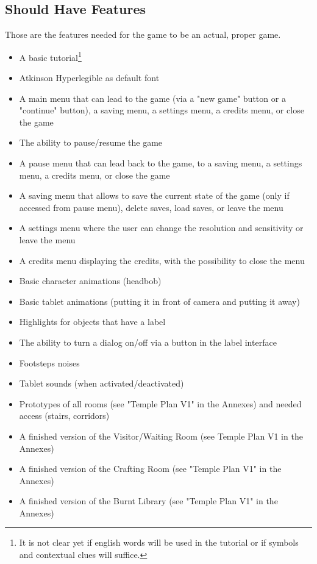 \documentclass{scrartcl}
\begin{document}
		\subsection{Should Have Features}
			Those are the features needed for the game to be an actual, proper game.
			\begin{itemize}
				\item A basic tutorial\footnote{It is not clear yet if english words will be used in the tutorial or if symbols and contextual clues will suffice.}
				\item Atkinson Hyperlegible as default font
				\item A main menu that can lead to the game (via a "new game" button or a "continue" button), a saving menu, a settings menu, a credits menu, or close the game
				\item The ability to pause/resume the game
				\item A pause menu that can lead back to the game, to a saving menu, a settings menu, a credits menu, or close the game
				\item A saving menu that allows to save the current state of the game (only if accessed from pause menu), delete saves, load saves, or leave the menu
				\item A settings menu where the user can change the resolution and sensitivity or leave the menu
				\item A credits menu displaying the credits, with the possibility to close the menu
				\item Basic character animations (headbob)
				\item Basic tablet animations (putting it in front of camera and putting it away)
				\item Highlights for objects that have a label
				\item The ability to turn a dialog on/off via a button in the label interface
				\item Footsteps noises
				\item Tablet sounds (when activated/deactivated)
				\item Prototypes of all rooms (see "Temple Plan V1" in the Annexes) and needed access (stairs, corridors)
				\item A finished version of the Visitor/Waiting Room (see Temple Plan V1 in the Annexes)
				\item A finished version of the Crafting Room (see "Temple Plan V1" in the Annexes)
				\item A finished version of the Burnt Library (see "Temple Plan V1" in the Annexes)

\end{itemize}
\end{document}
